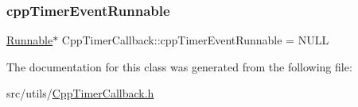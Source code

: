 \subsubsection{\texorpdfstring{cpp\+Timer\+Event\+Runnable}{cppTimerEventRunnable}}
{\footnotesize\ttfamily \hyperlink{classCppTimerCallback_1_1Runnable}{Runnable}$\ast$ Cpp\+Timer\+Callback\+::cpp\+Timer\+Event\+Runnable = N\+U\+LL\hspace{0.3cm}{\ttfamily [private]}}



The documentation for this class was generated from the following file\+:\begin{DoxyCompactItemize}
\item 
src/utils/\hyperlink{CppTimerCallback_8h}{Cpp\+Timer\+Callback.\+h}\end{DoxyCompactItemize}
